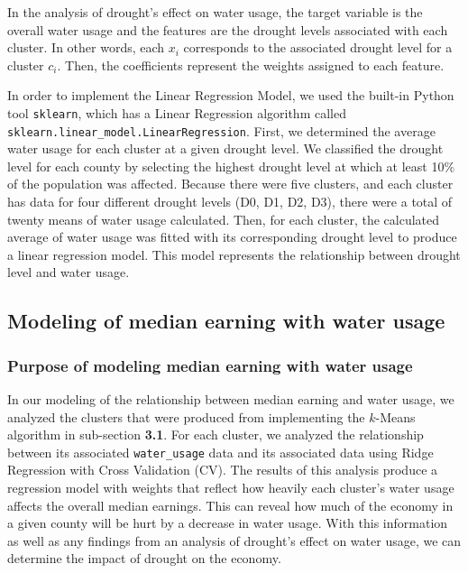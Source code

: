 \documentclass{article}
\begin{document}
In the analysis of drought's effect on water usage, the target variable is the overall water usage and the features are the drought levels associated with each cluster. In other words, each $x_i$ corresponds to the associated drought level for a cluster $c_i$. Then, the coefficients represent the weights assigned to each feature.

In order to implement the Linear Regression Model, we used the built-in Python tool \texttt{sklearn}, which has a Linear Regression algorithm called \texttt{sklearn.linear\_model.LinearRegression}. First, we determined the average water usage for each cluster at a given drought level. We classified the drought level for each county  by selecting the highest drought level at which at least 10\% of the population was affected. Because there were five clusters, and each cluster has data for four different drought levels (D0, D1, D2, D3), there were a total of twenty means of water usage calculated. Then, for each cluster, the calculated average of water usage was fitted with its corresponding drought level to produce a linear regression model. This model represents the relationship between drought level and water usage.

\subsection{Modeling of median earning with water usage}
\subsubsection{Purpose of modeling median earning with water usage}
In our modeling of the relationship between median earning and water usage, we analyzed the clusters that were produced from implementing the $k$-Means algorithm in sub-section \textbf{3.1}. For each cluster, we analyzed the relationship between its associated \texttt{water\_usage} data and its associated  data using Ridge Regression with Cross Validation (CV). The results of this analysis produce a regression model with weights that reflect how heavily each cluster's water usage affects the overall median earnings. This can reveal how much of the economy in a given county will be hurt by a decrease in water usage. With this information as well as any findings from an analysis of drought's effect on water usage, we can determine the impact of drought on the economy.
\end{document}
